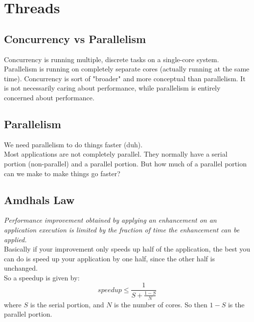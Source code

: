 \documentclass[12pt]{article}
\theoremstyle{definition}
\begin{document}
\section{Threads}

\subsection{Concurrency vs Parallelism}
Concurrency is running multiple, discrete tasks on a single-core system. Parallelism is running on completely separate cores (actually running at the same time). Concurrency is sort of "broader" and more conceptual than parallelism. It is not necessarily caring about performance, while parallelism is entirely concerned about performance.
\\ \linebreak
\subsection{Parallelism}
We need parallelism to do things faster (duh). 
\\ \linebreak
Most applications are not completely parallel. They normally have a serial portion (non-parallel) and a parallel portion. But how much of a parallel portion can we make to make things go faster?
\\ \linebreak
\subsection{Amdhals Law}
\textit{Performance improvement obtained by applying an enhancement on an application execution is limited by the fraction of time the enhancement can be applied.}
\\ \linebreak
Basically if your improvement only speeds up half of the application, the best you can do is speed up your application by one half, since the other half is unchanged. 
\\ \linebreak
So a speedup is given by:
$$speedup \leq \frac{1}{S + \frac{1-S}{N}}$$
where $S$ is the serial portion, and $N$ is the number of cores. So then $1-S$ is the parallel portion.
\end{document}
